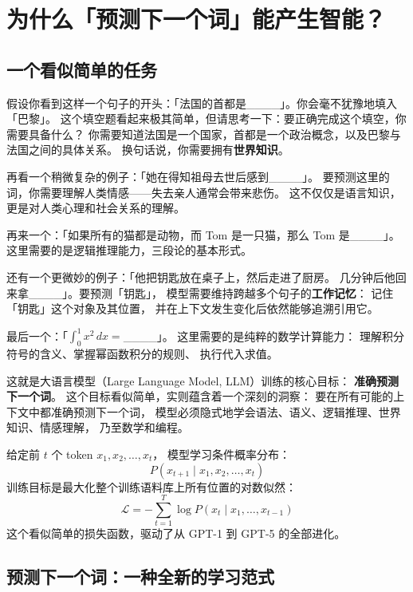 \chapter{为什么「预测下一个词」能产生智能？}
\label{ch:intro}

\section{一个看似简单的任务}

假设你看到这样一个句子的开头：「法国的首都是\_\_\_\_」。你会毫不犹豫地填入「巴黎」。
这个填空题看起来极其简单，但请思考一下：要正确完成这个填空，你需要具备什么？
你需要知道法国是一个国家，首都是一个政治概念，以及巴黎与法国之间的具体关系。
换句话说，你需要拥有\textbf{世界知识}。

再看一个稍微复杂的例子：「她在得知祖母去世后感到\_\_\_\_」。
要预测这里的词，你需要理解人类情感——失去亲人通常会带来悲伤。
这不仅仅是语言知识，更是对人类心理和社会关系的理解。

再来一个：「如果所有的猫都是动物，而 Tom 是一只猫，那么 Tom 是\_\_\_\_」。
这里需要的是逻辑推理能力，三段论的基本形式。

还有一个更微妙的例子：「他把钥匙放在桌子上，然后走进了厨房。
几分钟后他回来拿\_\_\_\_」。要预测「钥匙」，
模型需要维持跨越多个句子的\textbf{工作记忆}：
记住「钥匙」这个对象及其位置，
并在上下文发生变化后依然能够追溯引用它。

最后一个：「$\int_0^1 x^2 \, dx = $\_\_\_\_」。
这里需要的是纯粹的数学计算能力：
理解积分符号的含义、掌握幂函数积分的规则、
执行代入求值。

这就是大语言模型（Large Language Model, LLM）训练的核心目标：
\textbf{准确预测下一个词}。
这个目标看似简单，实则蕴含着一个深刻的洞察：
要在所有可能的上下文中都准确预测下一个词，
模型必须隐式地学会语法、语义、逻辑推理、世界知识、情感理解，
乃至数学和编程。

\begin{corebox}[预测下一个词的数学形式]
给定前 $t$ 个 token $x_1, x_2, \ldots, x_t$，
模型学习条件概率分布：
\[
  P(x_{t+1} \mid x_1, x_2, \ldots, x_t)
\]
训练目标是最大化整个训练语料库上所有位置的对数似然：
\[
  \mathcal{L} = -\sum_{t=1}^{T} \log P(x_t \mid x_1, \ldots, x_{t-1})
\]
这个看似简单的损失函数，驱动了从 GPT-1 到 GPT-5 的全部进化。
\end{corebox}

\section{预测下一个词：一种全新的学习范式}

